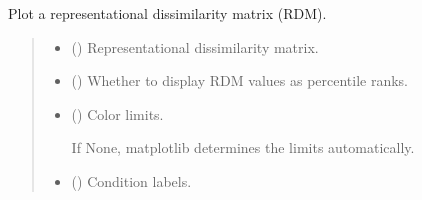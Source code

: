 \documentclass[letterpaper,10pt,english]{sphinxhowto}
\begin{document}
\begin{fulllineitems}
Plot a representational dissimilarity matrix (RDM).
\begin{quote}\begin{description}
\begin{itemize}
\item {} 
\sphinxAtStartPar
{} (\sphinxstyleliteralemphasis{\sphinxupquote{, }}\sphinxstyleliteralemphasis{\sphinxupquote{ {[}}}\sphinxstyleliteralemphasis{\sphinxupquote{, }}\sphinxstyleliteralemphasis{\sphinxupquote{{]}}}) \textendash{} Representational dissimilarity matrix.

\item {} 
\sphinxAtStartPar
{} (\sphinxstyleliteralemphasis{\sphinxupquote{, }}) \textendash{} Whether to display RDM values as percentile ranks.

\item {} 
\sphinxAtStartPar
{} (\sphinxstyleliteralemphasis{\sphinxupquote{, }}\sphinxstyleliteralemphasis{\sphinxupquote{(}}\sphinxstyleliteralemphasis{\sphinxupquote{, }}\sphinxstyleliteralemphasis{\sphinxupquote{)}}) \textendash{} 
\sphinxAtStartPar
Color limits.

\sphinxAtStartPar
If None, matplotlib determines the limits automatically.


\item {} 
\sphinxAtStartPar
{} (\sphinxstyleliteralemphasis{\sphinxupquote{, }}) \textendash{} Condition labels.


\end{itemize}
\end{description}
\end{quote}
\end{fulllineitems}
\end{document}
